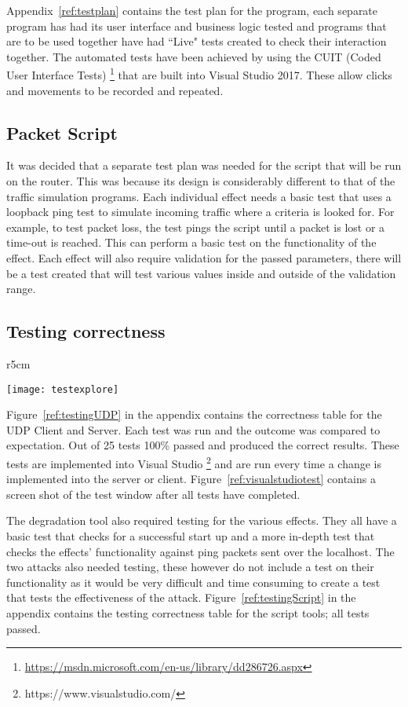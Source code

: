 Appendix~\ref{ref:testplan} contains the test plan for the program, each separate program has had its user interface and business logic tested and programs that are to be used together have had ``Live" tests created to check their interaction together. The automated tests have been achieved by using the CUIT (Coded User Interface Tests) \footnote{\url{https://msdn.microsoft.com/en-us/library/dd286726.aspx}} that are built into Visual Studio 2017. These allow clicks and movements to be recorded and repeated.

\subsection{Packet Script}
It was decided that a separate test plan was needed for the script that will be run on the router. This was because its design is considerably different to that of the traffic simulation programs. Each individual effect needs a basic test that uses a loopback ping test to simulate incoming traffic where a criteria is looked for. For example, to test packet loss, the test pings the script until a packet is lost or a time-out is reached. This can perform a basic test on the functionality of the effect. Each effect will also require validation for the passed parameters, there will be a test created that will test various values inside and outside of the validation range.

\subsection{Testing correctness}
\begin{wrapfigure}{r}{5cm}
\begin{center}
	\texttt{[image: testexplore]}
	\caption{Test explorer}
	\label{ref:visualstudiotest}
\end{center}
\end{wrapfigure}

Figure~\ref{ref:testingUDP} in the appendix contains the correctness table for the UDP Client and Server. Each test was run and the outcome was compared to expectation. Out of 25 tests 100\% passed and produced the correct results. These tests are implemented into Visual Studio \footnote{https://www.visualstudio.com/} and are run every time a change is implemented into the server or client. Figure~\ref{ref:visualstudiotest} contains a screen shot of the test window after all tests have completed.

The degradation tool also required testing for the various effects. They all have a basic test that checks for a successful start up and a more in-depth test that checks the effects' functionality against ping packets sent over the localhost. The two attacks also needed testing, these however do not include a test on their functionality as it would be very difficult and time consuming to create a test that tests the effectiveness of the attack. Figure~\ref{ref:testingScript} in the appendix contains the testing correctness table for the script tools; all tests passed.

